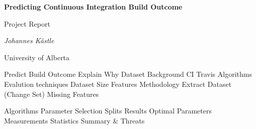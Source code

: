 \documentclass[a4paper,11pt]{report}
\begin{document}
	
	\begin{center}
	{\huge\bfseries Predicting Continuous Integration Build Outcome \par}
	{\Large Project Report\par}
	
	\vspace{1cm}
	{\Large\itshape Johannes Kästle\par}
	{ University of Alberta \par}
	\end{center}


\setlength{\parindent}{0pt}
\setlength{\parskip}{1.5ex plus0.5ex minus0.5ex}

Predict Build Outcome
	Explain Why
	Dataset
Background
	CI Travis
	Algorithms
	Evalution techniques
Dataset
	Size
	Features
Methodology
	Extract Dataset (Change Set)
	Missing Features
	
	Algorithms
	Parameter Selection
	Splits
Results
	Optimal Parameters
	Measurements
	Statistics
Summary \& Threats
	
	


\cite{msr17challenge}



\end{document}
